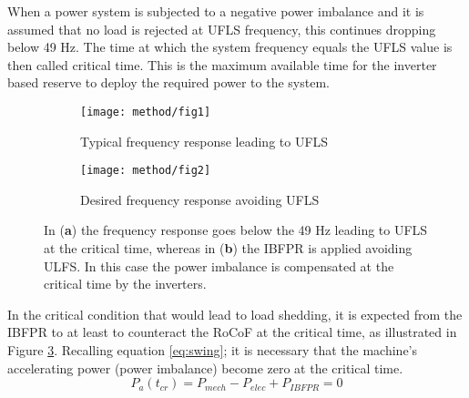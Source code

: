 When a power system is subjected to a negative power imbalance and it is assumed that no load is rejected at UFLS frequency, this continues dropping below 49 Hz. The time at which the system frequency equals the UFLS value is then called critical time. This is the maximum available time for the inverter based reserve to deploy the required power to the system. \\

\begin{figure}[h]
	\centering
	\begin{subfigure}[h]{0.45\textwidth}
		\centering
		\texttt{[image: method/fig1]}
		\caption{Typical frequency response leading to UFLS}
		\label{fig:freqresp_before}	
	\end{subfigure}
	\hfill
	\begin{subfigure}[h]{0.45\textwidth}
		\centering
		\texttt{[image: method/fig2]}	
		\caption{Desired frequency response avoiding UFLS}
		\label{fig:freqresp_after}
	\end{subfigure}
	
	
	\caption{In (\textbf{a}) the frequency response goes below the 49 Hz leading to UFLS at the critical time, whereas in (\textbf{b}) the IBFPR is applied avoiding ULFS. In this case the power imbalance is compensated at the critical time by the inverters.}
\end{figure} 

In the critical condition that would lead to load shedding, it is expected from the IBFPR to at least to counteract the RoCoF at the critical time, as illustrated in Figure \ref{fig:freqresp_after}.
Recalling equation \eqref{eq:swing}; it is necessary that the machine’s accelerating power (power imbalance) become zero at the critical time.
\begin{equation}
	\label{eq:powerbalance}
	P_a (t_{cr} )=P_{mech}-P_{elec}+P_{IBFPR}=0
\end{equation} 

